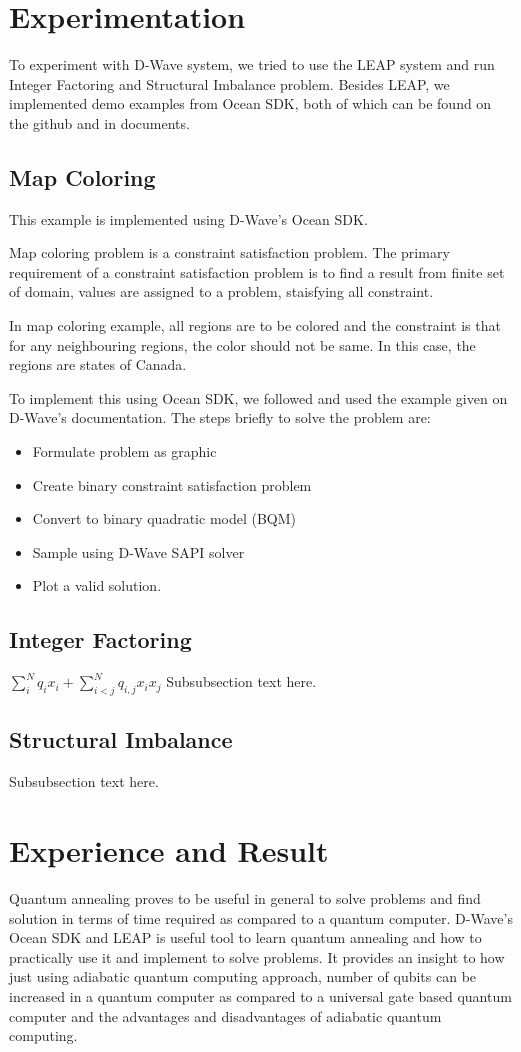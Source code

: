 \documentclass[12pt,conference]{IEEEtran}
\begin{document}
\section{Experimentation}
To experiment with D-Wave system, we tried to use the LEAP system and run Integer Factoring and Structural Imbalance problem. Besides LEAP, we implemented demo examples from Ocean SDK, both of which can be found on the github and in documents.


\subsection{Map Coloring}
This example is implemented using D-Wave's Ocean SDK. 

Map coloring problem is a constraint satisfaction problem. The primary requirement of a constraint satisfaction problem is to find a result from finite set of domain, values are assigned to a problem, staisfying all constraint. 

In map coloring example, all regions are to be colored and the constraint is that for any neighbouring regions, the color should not be same. In this case, the regions are states of Canada.

To implement this using Ocean SDK, we followed and used the example given on D-Wave's documentation. The steps briefly to solve the problem are: 

\begin{itemize}
  \item Formulate problem as graphic
  \item Create binary constraint satisfaction problem
  \item Convert to binary quadratic model (BQM)
  \item Sample using D-Wave SAPI solver
  \item Plot a valid solution.
\end{itemize}

\subsection{Integer Factoring}
\hfill $\sum_i^N q_ix_i + \sum_{i<j}^N q_{i,j}x_i  x_j$
Subsubsection text here.

\subsection{Structural Imbalance}
Subsubsection text here.

\section{Experience and Result}
Quantum annealing proves to be useful in general to solve problems and find solution in terms of time required as compared to a quantum computer. D-Wave's Ocean SDK and LEAP is useful tool to learn quantum annealing and how to practically use it and implement to solve problems. It provides an insight to how just using adiabatic quantum computing approach, number of qubits can be increased in a quantum computer as compared to a universal gate based quantum computer and the advantages and disadvantages of adiabatic quantum computing. 
\end{document}
